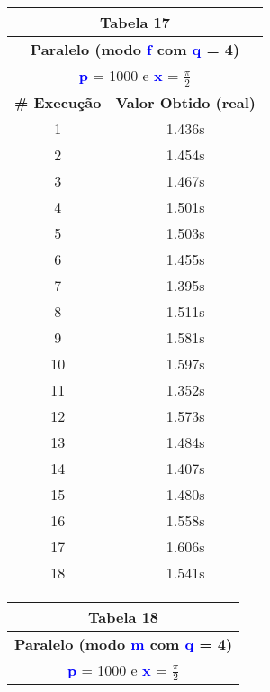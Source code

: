 \documentclass[11pt]{article}
\begin{document}
\begin{table}[!h]
	\begin{center}
		\begin{minipage}{0.48\textwidth}
			\begin{tabular}{| c | c |}
			\hline
			\multicolumn{2}{|c|}{\textbf{Tabela 17}} \\ \hline
			\multicolumn{2}{|c|}{\textbf{Paralelo (modo \textbf{\textcolor{blue}{f}} com \textbf{\textcolor{blue}{q}} = 4)}} \\
			\multicolumn{2}{|c|}{\textbf{\textcolor{blue}{p}} = 1000 e \textbf{\textcolor{blue}{x}} = $\frac{\pi}{2}$} \\ [0.2ex]
			\hline
				\textbf{\# Execução} &  \textbf{Valor Obtido (real)} \\ \hline
				1 & 1.436s \\ \hline
				2 & 1.454s \\ \hline
				3 & 1.467s \\ \hline
				4 & 1.501s \\ \hline
				5 & 1.503s \\ \hline
				6 & 1.455s \\ \hline
				7 & 1.395s \\ \hline
				8 & 1.511s \\ \hline
				9 & 1.581s \\ \hline
				10 & 1.597s \\ \hline
				11 & 1.352s \\ \hline
				12 & 1.573s \\ \hline
				13 & 1.484s \\ \hline
				14 & 1.407s \\ \hline
				15 & 1.480s \\ \hline
				16 & 1.558s \\ \hline
				17 & 1.606s \\ \hline
				18 & 1.541s \\ \hline
			\end{tabular}
		\end{minipage}
		\begin{minipage}{0.48\textwidth}
			\begin{tabular}{| c | c |}
			\hline
			\multicolumn{2}{|c|}{\textbf{Tabela 18}} \\ \hline
			\multicolumn{2}{|c|}{\textbf{Paralelo (modo \textbf{\textcolor{blue}{m}} com \textbf{\textcolor{blue}{q}} = 4)}} \\
			\multicolumn{2}{|c|}{\textbf{\textcolor{blue}{p}} = 1000 e \textbf{\textcolor{blue}{x}} = $\frac{\pi}{2}$} \\ [0.2ex]

\end{tabular}
\end{minipage}
\end{center}
\end{table}
\end{document}
